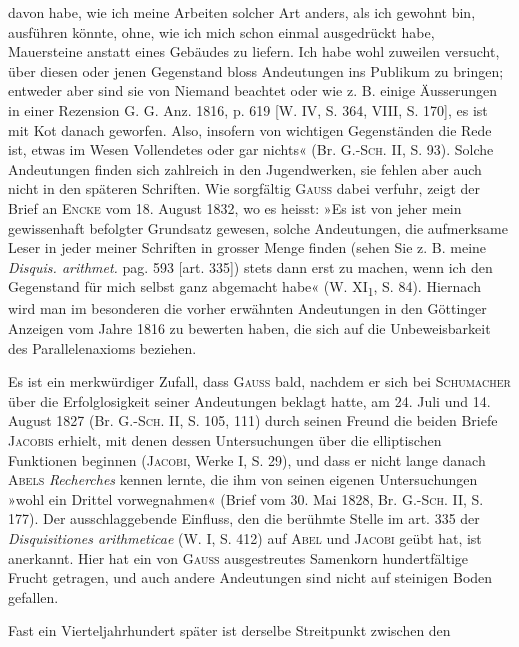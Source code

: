 davon habe, wie ich meine Arbeiten solcher Art anders, als ich gewohnt bin,
ausführen könnte, ohne, wie ich mich schon einmal ausgedrückt habe, Mauersteine
anstatt eines Gebäudes zu liefern. Ich habe wohl zuweilen versucht,
über diesen oder jenen Gegenstand bloss Andeutungen ins Publikum zu
bringen; entweder aber sind sie von Niemand beachtet oder wie z. B. einige
Äusserungen in einer Rezension G. G. Anz. 1816, p. 619 [W. IV, S. 364,
\clearpage{}
\noindent VIII, S. 170], es ist mit Kot danach geworfen. Also, insofern von wichtigen
Gegenständen die Rede ist, etwas im Wesen Vollendetes oder gar nichts«
(Br. G.-\textsc{Sch.} II, S. 93). Solche Andeutungen finden sich zahlreich in den
Jugendwerken, sie fehlen aber auch nicht in den späteren Schriften. Wie
sorgfältig \textsc{Gauss} dabei verfuhr, zeigt der Brief an \textsc{Encke} vom 18. August 1832,
wo es heisst: »Es ist von jeher mein gewissenhaft befolgter Grundsatz gewesen,
solche Andeutungen, die aufmerksame Leser in jeder meiner Schriften in grosser
Menge finden (sehen Sie z. B. meine \textit{Disquis. arithmet.} pag. 593 [art. 335]) stets
dann erst zu machen, wenn ich den Gegenstand für mich selbst ganz abgemacht
habe« (W. XI\textsubscript{1}, S. 84). Hiernach wird man im besonderen die vorher
erwähnten Andeutungen in den Göttinger Anzeigen vom Jahre 1816 zu bewerten
haben, die sich auf die Unbeweisbarkeit des Parallelenaxioms beziehen.
\par
Es ist ein merkwürdiger Zufall, dass \textsc{Gauss} bald, nachdem er sich bei
\textsc{Schumacher} über die Erfolglosigkeit seiner Andeutungen beklagt hatte, am
24. Juli und 14. August 1827 (Br. G.-\textsc{Sch.} II, S. 105, 111) durch seinen Freund
die beiden Briefe \textsc{Jacobis} erhielt, mit denen dessen Untersuchungen über die
elliptischen Funktionen beginnen (\textsc{Jacobi}, Werke I, S. 29), und dass er nicht
lange danach \textsc{Abels} \textit{Recherches} kennen lernte, die ihm von seinen eigenen
Untersuchungen »wohl ein Drittel vorwegnahmen« (Brief vom 30. Mai 1828,
Br. G.-\textsc{Sch.} II, S. 177). Der ausschlaggebende Einfluss, den die berühmte
Stelle im art. 335 der \textit{Disquisitiones arithmeticae} (W. I, S. 412) auf \textsc{Abel} und
\textsc{Jacobi} geübt hat, ist anerkannt. Hier hat ein von \textsc{Gauss} ausgestreutes Samenkorn
hundertfältige Frucht getragen, und auch andere Andeutungen sind nicht
auf steinigen Boden gefallen.
\par
Fast ein Vierteljahrhundert später ist derselbe Streitpunkt zwischen den
